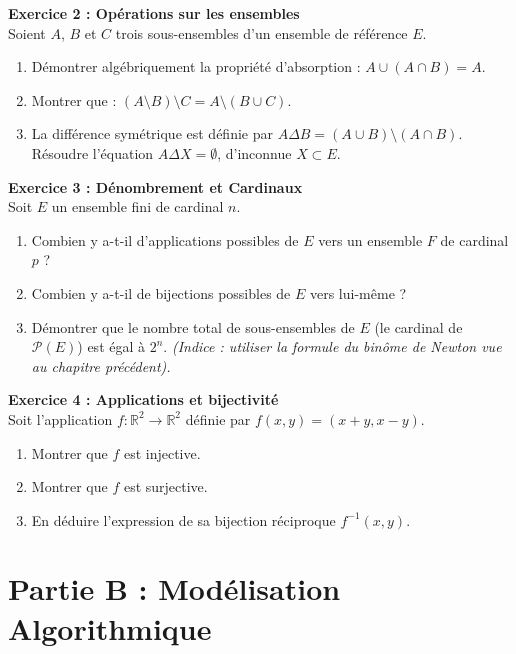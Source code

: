 \documentclass[12pt,a4paper]{report}
\begin{document}
\textbf{Exercice 2 : Opérations sur les ensembles} \\
Soient $A$, $B$ et $C$ trois sous-ensembles d'un ensemble de référence $E$.
\begin{enumerate}
    \item Démontrer algébriquement la propriété d'absorption : $A \cup (A \cap B) = A$.
    \item Montrer que : $(A \setminus B) \setminus C = A \setminus (B \cup C)$.
    \item La différence symétrique est définie par $A \Delta B = (A \cup B) \setminus (A \cap B)$. \\
    Résoudre l'équation $A \Delta X = \emptyset$, d'inconnue $X \subset E$.
\end{enumerate}

\textbf{Exercice 3 : Dénombrement et Cardinaux} \\
Soit $E$ un ensemble fini de cardinal $n$.
\begin{enumerate}
    \item Combien y a-t-il d'applications possibles de $E$ vers un ensemble $F$ de cardinal $p$ ?
    \item Combien y a-t-il de bijections possibles de $E$ vers lui-même ?
    \item Démontrer que le nombre total de sous-ensembles de $E$ (le cardinal de $\mathcal{P}(E)$) est égal à $2^n$. \textit{(Indice : utiliser la formule du binôme de Newton vue au chapitre précédent).}
\end{enumerate}

\textbf{Exercice 4 : Applications et bijectivité} \\
Soit l'application $f : \mathbb{R}^2 \to \mathbb{R}^2$ définie par $f(x,y) = (x+y, x-y)$.
\begin{enumerate}
    \item Montrer que $f$ est injective.
    \item Montrer que $f$ est surjective.
    \item En déduire l'expression de sa bijection réciproque $f^{-1}(x,y)$.
\end{enumerate}

\vspace{1cm}

\section*{Partie B : Modélisation Algorithmique}
\end{document}
